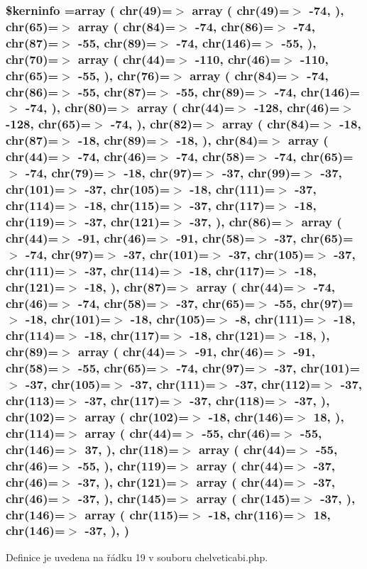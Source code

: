 \hypertarget{chelveticabi_8php_ab4bb7d3b0332c517f6a42a1924f01000}{
\subsubsection[{\$kerninfo}]{\setlength{\rightskip}{0pt plus 5cm}\$kerninfo =array ( chr(49)=$>$ array ( chr(49)=$>$ -\/74, ), chr(65)=$>$ array ( chr(84)=$>$ -\/74, chr(86)=$>$ -\/74, chr(87)=$>$ -\/55, chr(89)=$>$ -\/74, chr(146)=$>$ -\/55, ), chr(70)=$>$ array ( chr(44)=$>$ -\/110, chr(46)=$>$ -\/110, chr(65)=$>$ -\/55, ), chr(76)=$>$ array ( chr(84)=$>$ -\/74, chr(86)=$>$ -\/55, chr(87)=$>$ -\/55, chr(89)=$>$ -\/74, chr(146)=$>$ -\/74, ), chr(80)=$>$ array ( chr(44)=$>$ -\/128, chr(46)=$>$ -\/128, chr(65)=$>$ -\/74, ), chr(82)=$>$ array ( chr(84)=$>$ -\/18, chr(87)=$>$ -\/18, chr(89)=$>$ -\/18, ), chr(84)=$>$ array ( chr(44)=$>$ -\/74, chr(46)=$>$ -\/74, chr(58)=$>$ -\/74, chr(65)=$>$ -\/74, chr(79)=$>$ -\/18, chr(97)=$>$ -\/37, chr(99)=$>$ -\/37, chr(101)=$>$ -\/37, chr(105)=$>$ -\/18, chr(111)=$>$ -\/37, chr(114)=$>$ -\/18, chr(115)=$>$ -\/37, chr(117)=$>$ -\/18, chr(119)=$>$ -\/37, chr(121)=$>$ -\/37, ), chr(86)=$>$ array ( chr(44)=$>$ -\/91, chr(46)=$>$ -\/91, chr(58)=$>$ -\/37, chr(65)=$>$ -\/74, chr(97)=$>$ -\/37, chr(101)=$>$ -\/37, chr(105)=$>$ -\/37, chr(111)=$>$ -\/37, chr(114)=$>$ -\/18, chr(117)=$>$ -\/18, chr(121)=$>$ -\/18, ), chr(87)=$>$ array ( chr(44)=$>$ -\/74, chr(46)=$>$ -\/74, chr(58)=$>$ -\/37, chr(65)=$>$ -\/55, chr(97)=$>$ -\/18, chr(101)=$>$ -\/18, chr(105)=$>$ -\/8, chr(111)=$>$ -\/18, chr(114)=$>$ -\/18, chr(117)=$>$ -\/18, chr(121)=$>$ -\/18, ), chr(89)=$>$ array ( chr(44)=$>$ -\/91, chr(46)=$>$ -\/91, chr(58)=$>$ -\/55, chr(65)=$>$ -\/74, chr(97)=$>$ -\/37, chr(101)=$>$ -\/37, chr(105)=$>$ -\/37, chr(111)=$>$ -\/37, chr(112)=$>$ -\/37, chr(113)=$>$ -\/37, chr(117)=$>$ -\/37, chr(118)=$>$ -\/37, ), chr(102)=$>$ array ( chr(102)=$>$ -\/18, chr(146)=$>$ 18, ), chr(114)=$>$ array ( chr(44)=$>$ -\/55, chr(46)=$>$ -\/55, chr(146)=$>$ 37, ), chr(118)=$>$ array ( chr(44)=$>$ -\/55, chr(46)=$>$ -\/55, ), chr(119)=$>$ array ( chr(44)=$>$ -\/37, chr(46)=$>$ -\/37, ), chr(121)=$>$ array ( chr(44)=$>$ -\/37, chr(46)=$>$ -\/37, ), chr(145)=$>$ array ( chr(145)=$>$ -\/37, ), chr(146)=$>$ array ( chr(115)=$>$ -\/18, chr(116)=$>$ 18, chr(146)=$>$ -\/37, ), )}}\label{chelveticabi_8php_ab4bb7d3b0332c517f6a42a1924f01000}


Definice je uvedena na řádku 19 v souboru chelveticabi.\-php.


